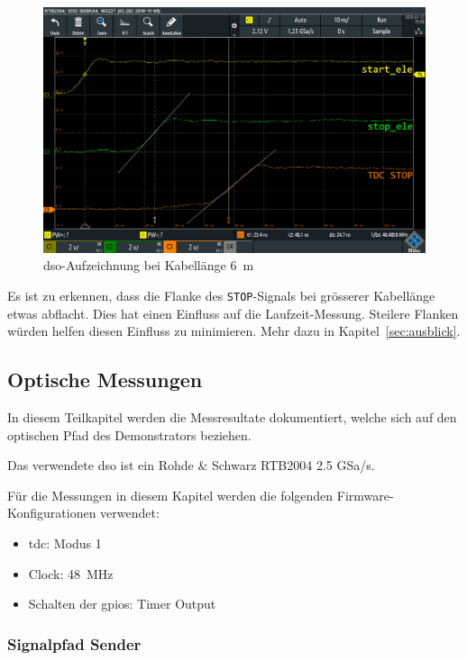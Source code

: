 \begin{figure}[H]
    \centering
    \includegraphics[width=\textwidth]{graphics/different_cable_lengths_with_dso_6m.png}
    \caption{\acrshort{dso}-Aufzeichnung bei Kabellänge 6~m}\label{fig:different_cable_lengths_with_dso_6m}
\end{figure}

Es ist zu erkennen, dass die Flanke des \lstinline|STOP|-Signals bei grösserer Kabellänge etwas abflacht. Dies hat einen
Einfluss auf die Laufzeit-Messung. Steilere Flanken würden helfen diesen Einfluss zu minimieren. Mehr dazu in
Kapitel~\ref{sec:ausblick}. %

\pagebreak

\subsection{Optische Messungen}

In diesem Teilkapitel werden die Messresultate dokumentiert, welche sich auf den optischen Pfad des Demonstrators
beziehen.

Das verwendete \acrshort{dso} ist ein Rohde \& Schwarz RTB2004 2.5 GSa/s.

Für die Messungen in diesem Kapitel werden die folgenden Firmware-Konfigurationen verwendet:

\begin{itemize}
    \item \acrshort{tdc}: Modus 1
    \item Clock: 48~MHz
    \item Schalten der \acrshort{gpio}s: Timer Output
\end{itemize}

\subsubsection{Signalpfad Sender}\label{sec:messungen_signalpfad_sender}

